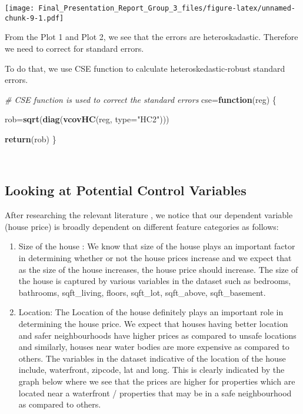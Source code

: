 \documentclass[
]{article}
\newenvironment{Shaded}{\begin{snugshade}}{\end{snugshade}}
\newcommand{\CommentTok}[1]{\textcolor[rgb]{0.56,0.35,0.01}{\textit{#1}}}
\newcommand{\ControlFlowTok}[1]{\textcolor[rgb]{0.13,0.29,0.53}{\textbf{#1}}}
\newcommand{\DataTypeTok}[1]{\textcolor[rgb]{0.13,0.29,0.53}{#1}}
\newcommand{\KeywordTok}[1]{\textcolor[rgb]{0.13,0.29,0.53}{\textbf{#1}}}
\newcommand{\NormalTok}[1]{#1}
\newcommand{\StringTok}[1]{\textcolor[rgb]{0.31,0.60,0.02}{#1}}
\begin{document}
\texttt{[image: Final\_Presentation\_Report\_Group\_3\_files/figure-latex/unnamed-chunk-9-1.pdf]}

From the Plot 1 and Plot 2, we see that the errors are heteroskadastic.
Therefore we need to correct for standard errors.

To do that, we use CSE function to calculate heteroskedastic-robust
standard errors.

\begin{Shaded}
\begin{Highlighting}[]
\CommentTok{# CSE function is used to correct the standard errors}
\NormalTok{cse=}\ControlFlowTok{function}\NormalTok{(reg) \{}

\NormalTok{        rob=}\KeywordTok{sqrt}\NormalTok{(}\KeywordTok{diag}\NormalTok{(}\KeywordTok{vcovHC}\NormalTok{(reg, }\DataTypeTok{type=}\StringTok{"HC2"}\NormalTok{)))}

        \KeywordTok{return}\NormalTok{(rob)}
\NormalTok{\}}
\end{Highlighting}
\end{Shaded}

~

\hypertarget{looking-at-potential-control-variables}{%
\subsection{Looking at Potential Control
Variables}\label{looking-at-potential-control-variables}}

After researching the relevant literature , we notice that our dependent
variable (house price) is broadly dependent on different feature
categories as follows:

\begin{enumerate}
\def\labelenumi{\arabic{enumi}.}
\item
  Size of the house : We know that size of the house plays an important
  factor in determining whether or not the house prices increase and we
  expect that as the size of the house increases, the house price should
  increase. The size of the house is captured by various variables in
  the dataset such as bedrooms, bathrooms, sqft\_living, floors,
  sqft\_lot, sqft\_above, sqft\_basement.
\item
  Location: The Location of the house definitely plays an important role
  in determining the house price. We expect that houses having better
  location and safer neighbourhoods have higher prices as compared to
  unsafe locations and similarly, houses near water bodies are more
  expensive as compared to others. The variables in the dataset
  indicative of the location of the house include, waterfront, zipcode,
  lat and long. This is clearly indicated by the graph below where we
  see that the prices are higher for properties which are located near a
  waterfront / properties that may be in a safe neighbourhood as
  compared to others.
\end{enumerate}
\end{document}
